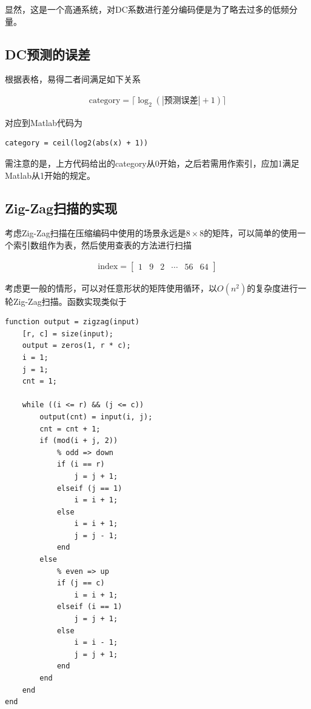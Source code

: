 \documentclass[10pt, a4paper]{article}
\begin{document}
显然，这是一个高通系统，对DC系数进行差分编码便是为了略去过多的低频分量。

\subsection{DC预测的误差}

根据表格，易得二者间满足如下关系

\begin{align*}
    \text{category} = \lceil \log_2(|\text{预测误差}| + 1) \rceil
\end{align*}

对应到Matlab代码为

\begin{verbatim}
category = ceil(log2(abs(x) + 1))
\end{verbatim}

需注意的是，上方代码给出的category从0开始，之后若需用作索引，应加1满足Matlab从1开始的规定。

\subsection{Zig-Zag扫描的实现}

考虑Zig-Zag扫描在压缩编码中使用的场景永远是$8\times8$的矩阵，可以简单的使用一个索引数组作为表，然后使用查表的方法进行扫描

\begin{align*}
    \text{index} =
    \begin{bmatrix}
        1 & 9 & 2 & \cdots & 56 & 64
    \end{bmatrix}
\end{align*}

考虑更一般的情形，可以对任意形状的矩阵使用循环，以$O(n^2)$的复杂度进行一轮Zig-Zag扫描。函数实现类似于

\begin{verbatim}
function output = zigzag(input)
    [r, c] = size(input);
    output = zeros(1, r * c);
    i = 1;
    j = 1;
    cnt = 1;
    
    while ((i <= r) && (j <= c))
        output(cnt) = input(i, j);
        cnt = cnt + 1;
        if (mod(i + j, 2))
            % odd => down
            if (i == r)
                j = j + 1;
            elseif (j == 1)
                i = i + 1;
            else
                i = i + 1;
                j = j - 1;
            end
        else
            % even => up
            if (j == c)
                i = i + 1;
            elseif (i == 1)
                j = j + 1;
            else
                i = i - 1;
                j = j + 1;
            end
        end
    end
end
\end{verbatim}
\end{document}
